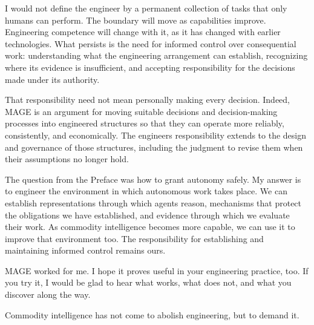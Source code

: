 
I would not define the engineer by a permanent collection of tasks that only humans can perform. The boundary will move as capabilities improve. Engineering competence will change with it, as it has changed with earlier technologies. What persists is the need for informed control over consequential work: understanding what the engineering arrangement can establish, recognizing where its evidence is insufficient, and accepting responsibility for the decisions made under its authority.


That responsibility need not mean personally making every decision. Indeed, MAGE is an argument for moving suitable decisions and decision-making processes into engineered structures so that they can operate more reliably, consistently, and economically. The engineer\textquotesingle s responsibility extends to the design and governance of those structures, including the judgment to revise them when their assumptions no longer hold.

The question from the Preface was how to grant autonomy safely. My answer is to engineer the environment in which autonomous work takes place. We can establish representations through which agents reason, mechanisms that protect the obligations we have established, and evidence through which we evaluate their work. As commodity intelligence becomes more capable, we can use it to improve that environment too. The responsibility for establishing and maintaining informed control remains ours.

MAGE worked for me. I hope it proves useful in your engineering practice, too. If you try it, I would be glad to hear what works, what does not, and what you discover along the way.


\magerule{}

Commodity intelligence has not come to abolish engineering, but to demand it.

